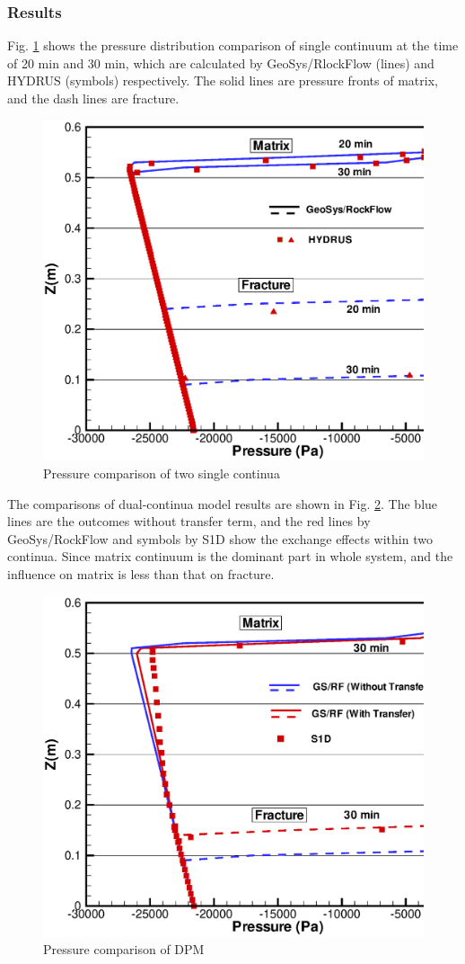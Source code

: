 \subsubsection*{Results}
Fig. \ref{us:result-dual-line-c1} shows the pressure distribution
comparison of single continuum at the time of 20 min and 30 min,
which are calculated by GeoSys/RlockFlow (lines) and HYDRUS
(symbols) respectively. The solid lines are pressure fronts of
matrix, and the dash lines are fracture.
\begin{figure} [htb!]
 \centering
 \includegraphics[width=0.75\columnwidth] {H_US/figures/dual_single.eps}
 \caption{Pressure comparison of two single continua}
 \label{us:result-dual-line-c1}
\end{figure}
The comparisons of dual-continua model results are shown in Fig.
\ref{us:result-dual-line-c2}. The blue lines are the outcomes
without transfer term, and the red lines by GeoSys/RockFlow and
symbols by S1D show the exchange effects within two continua.
Since matrix continuum is the dominant part in whole system, and
the influence on matrix is less than that on fracture.

\begin{figure} [htb!]
 \centering
 \includegraphics[width=0.75\columnwidth] {H_US/figures/dual_coupled.eps}
 \caption{Pressure comparison of DPM}
 \label{us:result-dual-line-c2}
\end{figure}
